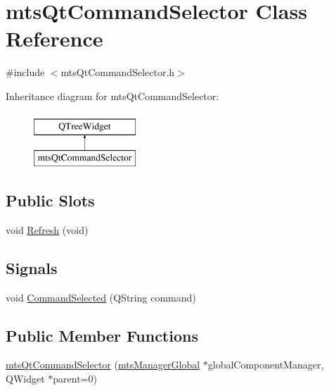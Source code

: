 \hypertarget{classmts_qt_command_selector}{}\section{mts\+Qt\+Command\+Selector Class Reference}
\label{classmts_qt_command_selector}


{\ttfamily \#include $<$mts\+Qt\+Command\+Selector.\+h$>$}

Inheritance diagram for mts\+Qt\+Command\+Selector\+:\begin{figure}[H]
\begin{center}
\leavevmode
\includegraphics[height=2.000000cm]{db/db7/classmts_qt_command_selector}
\end{center}
\end{figure}
\subsection*{Public Slots}
\begin{DoxyCompactItemize}
\item 
void \hyperlink{classmts_qt_command_selector_aa168a80d09030ba728711a6358334dc8}{Refresh} (void)
\end{DoxyCompactItemize}
\subsection*{Signals}
\begin{DoxyCompactItemize}
\item 
void \hyperlink{classmts_qt_command_selector_aabecb88e0546b2b8d3ca21fa5a3e3c93}{Command\+Selected} (Q\+String command)
\end{DoxyCompactItemize}
\subsection*{Public Member Functions}
\begin{DoxyCompactItemize}
\item 
\hyperlink{classmts_qt_command_selector_a0789c7aa2bb0684c09bbadd34576081d}{mts\+Qt\+Command\+Selector} (\hyperlink{classmts_manager_global}{mts\+Manager\+Global} $\ast$global\+Component\+Manager, Q\+Widget $\ast$parent=0)
\end{DoxyCompactItemize}


